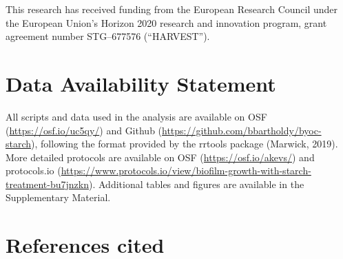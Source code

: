 \documentclass[
]{article}
\begin{document}
This research has received funding from the European Research Council under the
European Union's Horizon 2020 research and innovation program, grant agreement
number STG--677576 (``HARVEST'').

\hypertarget{data-availability-statement}{%
\section*{Data Availability Statement}\label{data-availability-statement}}

All scripts and data used in the analysis are available on OSF
(\url{https://osf.io/uc5qy/}) and Github (\url{https://github.com/bbartholdy/byoc-starch}),
following the format provided by the rrtools package (Marwick, 2019).
More detailed protocols are available on OSF (\url{https://osf.io/akevs/}) and protocols.io (\url{https://www.protocols.io/view/biofilm-growth-with-starch-treatment-bu7jnzkn}).
Additional tables and figures are available in the Supplementary Material.

\hypertarget{references-cited}{%
\section*{References cited}\label{references-cited}}
\end{document}
